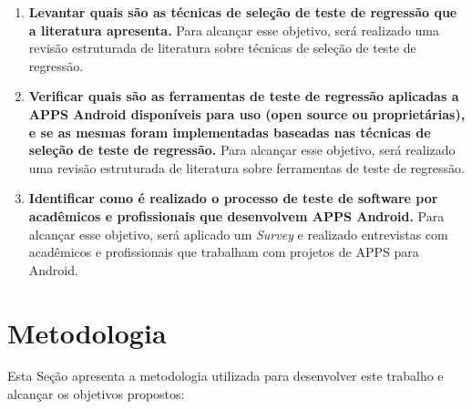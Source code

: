 \begin{enumerate}[label=\bf O\arabic*,leftmargin=1.5cm]

    \item \textbf{Levantar quais são as técnicas de seleção de teste de regressão que a literatura apresenta.} Para alcançar esse objetivo, será realizado uma revisão estruturada de literatura sobre técnicas de seleção de teste de regressão.
    
    \item \textbf{Verificar quais são as ferramentas de teste de regressão aplicadas a \ac{APPS} Android disponíveis para uso (open source ou proprietárias), e se as mesmas foram implementadas baseadas nas técnicas de seleção de teste de regressão.} Para alcançar esse objetivo, será realizado uma revisão estruturada de literatura sobre ferramentas de teste de regressão.
    
    \item \textbf{Identificar como é realizado o processo de teste de software por acadêmicos e profissionais que desenvolvem \ac{APPS} Android.} Para alcançar esse objetivo, será aplicado um \textit{Survey} e realizado entrevistas com acadêmicos e profissionais que trabalham com projetos de \ac{APPS} para Android.


\end{enumerate}



\section{Metodologia}\label{sec:metodologia}


Esta Seção apresenta a metodologia utilizada para desenvolver este trabalho e alcançar os objetivos propostos:


